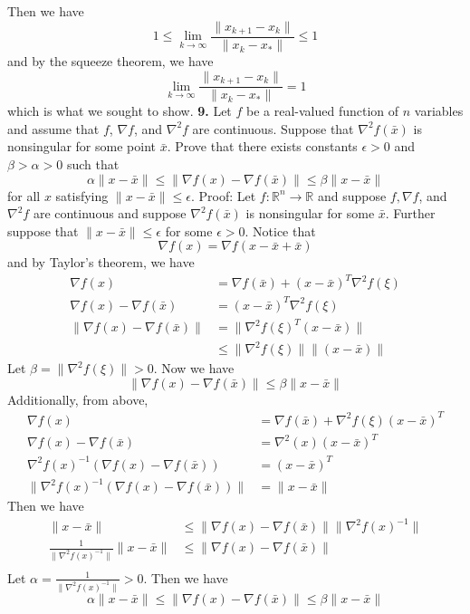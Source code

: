 \documentclass{article}
\begin{document}
Then we have
\newline
\[1 \leq \lim_{k \to \infty} \frac{\|x_{k+1} - x_k\|}{\|x_k - x_*\|} \leq 1\]
\newline
and by the squeeze theorem, we have
\newline
\[\lim_{k \to \infty} \frac{\|x_{k+1} - x_k\|}{\|x_k - x_*\|} = 1\]
\newline
which is what we sought to show.
\newline\newline\newline
\textbf{9.} Let $f$ be a real-valued function of $n$ variables and assume that $f$, $\nabla f$, and $\nabla^2f$ are continuous. Suppose that $\nabla^2f(\bar{x})$ is nonsingular for some point $\bar{x}$. Prove that there exists constants $\epsilon > 0$ and $\beta > \alpha > 0$ such that
\[\alpha\|x - \bar{x}\| \leq \|\nabla f(x) - \nabla f(\bar{x})\| \leq \beta \|x - \bar{x}\|\]
for all $x$ satisfying $\|x - \bar{x}\| \leq \epsilon$.
\newline\newline\newline
Proof: Let $f: \mathbb{R}^n \to \mathbb{R}$ and suppose $f,\nabla f$, and $\nabla^2f$ are continuous and suppose $\nabla^2f(\bar{x})$ is nonsingular for some $\bar{x}$. Further suppose that $\|x - \bar{x}\| \leq \epsilon$ for some $\epsilon > 0$. Notice that
\[\nabla f(x) = \nabla f(x - \bar{x} + \bar{x})\]
and by Taylor's theorem, we have
\begin{align*}
    \nabla f(x) &= \nabla f(\bar{x}) + (x - \bar{x})^T\nabla^2f(\xi)\\
    \nabla f(x) - \nabla f(\bar{x}) &= (x - \bar{x})^T\nabla^2f(\xi)\\
    \|\nabla f(x) - \nabla f(\bar{x})\| &= \|\nabla^2f(\xi)^T(x - \bar{x})\| \\
    &\leq \|\nabla^2f(\xi)\|\|(x - \bar{x})\|
\end{align*}
Let $\beta = \|\nabla^2f(\xi)\| > 0$. Now we have
\[\|\nabla f(x) - \nabla f(\bar{x})\| \leq \beta \|x - \bar{x}\|\]
Additionally, from above,
\begin{align*}
    \nabla f(x) &= \nabla f(\bar{x}) + \nabla^2f(\xi)(x - \bar{x})^T\\
    \nabla f(x) - \nabla f(\bar{x}) &= \nabla^2(x)(x - \bar{x})^T\\
    \nabla^2f(x)^{-1}(\nabla f(x) - \nabla f(\bar{x})) &= (x - \bar{x})^T\\
    \|\nabla^2f(x)^{-1}(\nabla f(x) - \nabla f(\bar{x}))\| &= \|x - \bar{x}\|
\end{align*}
Then we have 
\begin{align*}
    \|x - \bar{x}\| &\leq \|\nabla f(x) - \nabla f(\bar{x})\|\|\nabla^2f(x)^{-1}\| \\
    \frac{1}{\|\nabla^2f(x)^{-1}\|} \|x - \bar{x}\| &\leq \|\nabla f(x) - \nabla f(\bar{x})\| \\
\end{align*}
Let $\alpha = \frac{1}{\|\nabla^2f(x)^{-1}\|} > 0$. Then we have
\[\alpha \|x - \bar{x}\| \leq \|\nabla f(x) - \nabla f(\bar{x})\| \leq \beta\|x - \bar{x}\|\]
\end{document}
